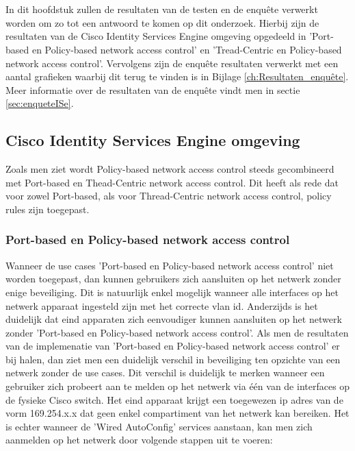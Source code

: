 
 \chapter{}
\label{ch:Resultaten}
In dit hoofdstuk zullen de resultaten van de testen en de enquête verwerkt worden om zo tot een antwoord te komen op dit onderzoek. Hierbij zijn de resultaten van de Cisco Identity Services Engine omgeving opgedeeld in 'Port-based en Policy-based network access control' en 'Tread-Centric en Policy-based network access control'. Vervolgens zijn de enquête resultaten verwerkt met een aantal grafieken waarbij dit terug te vinden is in Bijlage \ref{ch:Resultaten_enquête}. Meer informatie over de resultaten van de enquête vindt men in sectie \ref{sec:enqueteISe}.

\section{Cisco Identity Services Engine omgeving}
Zoals men ziet wordt Policy-based network access control steeds gecombineerd met Port-based en Thead-Centric network access control. Dit heeft als rede dat voor zowel Port-based, als voor Thread-Centric network access control, policy rules zijn toegepast.

\subsection{Port-based en Policy-based network access control}
Wanneer de use cases 'Port-based en Policy-based network access control' niet worden toegepast, dan kunnen gebruikers zich aansluiten op het netwerk zonder enige beveiliging. Dit is natuurlijk enkel mogelijk wanneer alle interfaces op het netwerk apparaat ingesteld zijn met het correcte vlan id. Anderzijds is het duidelijk dat eind apparaten zich eenvoudiger kunnen aansluiten op het netwerk zonder 'Port-based en Policy-based network access control'.
Als men de resultaten van de implemenatie van 'Port-based en Policy-based network access control' er bij halen, dan ziet men een duidelijk verschil in beveiliging ten opzichte van een netwerk zonder de use cases. Dit verschil is duidelijk te merken wanneer een gebruiker zich probeert aan te melden op het netwerk via één van de interfaces op de fysieke Cisco switch. Het eind apparaat krijgt een toegewezen ip adres van de vorm 169.254.x.x dat geen enkel compartiment van het netwerk kan bereiken. 
\newline
\newline
Het is echter wanneer de 'Wired AutoConfig' services aanstaan, kan men zich aanmelden op het netwerk door volgende stappen uit te voeren: 

